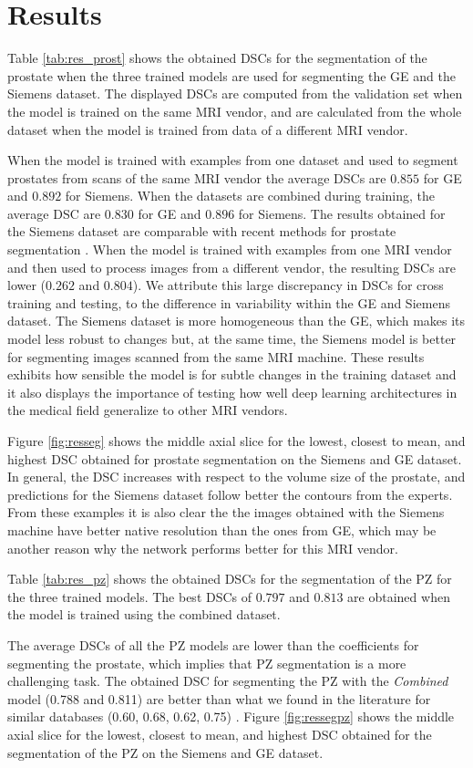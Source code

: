 \section{Results}
Table \ref{tab:res_prost} shows the obtained DSCs for the segmentation of the prostate when the three trained models are used for segmenting the GE and the Siemens dataset. The displayed DSCs are computed from the validation set when the model is trained on the same MRI vendor, and are calculated from the whole dataset when the model is trained from data of a different MRI vendor.

When the model is trained with examples from one dataset and used to segment prostates from scans of the same MRI vendor the average DSCs are $0.855$ for GE and $0.892$ for Siemens. When the datasets are combined during training, the average DSC are $0.830$ for GE and $0.896$ for Siemens.  The results obtained for the Siemens dataset are comparable with recent methods for prostate segmentation \cite{guo2016deformable, lozoya2018assessing, jia20183d}. When the model is trained with examples from one MRI vendor and then used to process images from a different vendor, the resulting DSCs are lower ($0.262$ and $0.804$). We attribute this large discrepancy in DSCs for cross training and testing, to the difference in variability within the GE and Siemens dataset. The Siemens dataset is more homogeneous than the GE, which makes its model less robust to changes but, at the same time, the Siemens model is better for segmenting images scanned from the same MRI machine. These results exhibits how sensible the model is for subtle changes in the training dataset and it also displays the importance of testing how well deep learning architectures in the medical field generalize to other MRI vendors. 

Figure \ref{fig:resseg} shows the middle axial slice for the lowest, closest to mean, and highest DSC obtained for prostate segmentation on the Siemens and GE dataset. In general, the DSC increases with respect to the volume size of the prostate, and predictions for the Siemens dataset follow better the contours from the experts. From these examples it is also clear the the images obtained with the Siemens machine have better native resolution than the ones from GE, which may be another reason why the network performs better for this MRI vendor. 

Table \ref{tab:res_pz} shows the obtained DSCs for the segmentation of the PZ for the three trained models.  The best DSCs of $0.797$ and $0.813$ are obtained when the model is trained using the combined dataset.  

The average DSCs of all the PZ models are lower than the coefficients for segmenting the prostate, which implies that PZ segmentation is a more challenging task. The obtained DSC for segmenting the PZ with the \emph{Combined} model (0.788 and 0.811) are better than what we found in the literature for similar databases (0.60, 0.68, 0.62, 0.75) \cite{mooij_automatic_2018,toth_simultaneous_2013, chilali_gland_2016, hutchison_pattern_2012}. Figure \ref{fig:ressegpz} shows the middle axial slice for the lowest, closest to mean, and highest DSC obtained for the segmentation of the PZ on the Siemens and GE dataset. 

